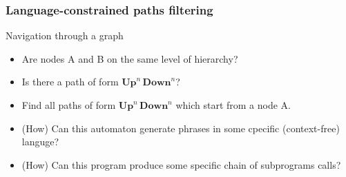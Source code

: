 \documentclass{beamer}
\begin{document}
\begin{frame}[fragile]
  \transwipe[direction=90]
  \frametitle{Language-constrained paths filtering}
  \begin{minipage}[m]{0.45\linewidth}
\end{minipage}\hfill
\begin{minipage}[m]{0.5\linewidth}
Navigation through a graph
\begin{itemize}
      \item Are nodes A and B on the same level of hierarchy?
      \item Is there a path of form $\textbf{Up}^n \, \textbf{Down}^n$?
      \item Find all paths of form $\textbf{Up}^n \, \textbf{Down}^n$ which start from a node A.
\end{itemize}

\end{minipage}

  \begin{itemize}
    \item (How) Can this automaton generate phrases in some cpecific (context-free) languge?
    \item (How) Can this program produce some specific chain of subprograms calls? 
  \end{itemize}
\end{frame}
\end{document}

